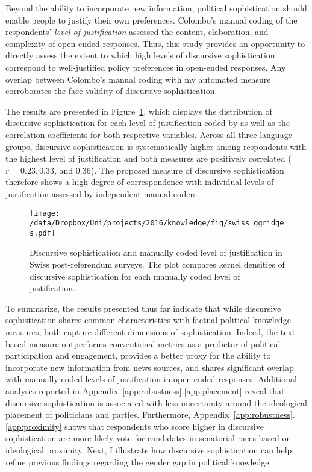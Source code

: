 Beyond the ability to incorporate new information, political sophistication should enable people to justify their own preferences. Colombo's \citeyearpar{colombo2016justifications} manual coding of the respondents' \textit{level of justification} assessed the content, elaboration, and complexity of open-ended responses. Thus, this study provides an opportunity to directly assess the extent to which high levels of discursive sophistication correspond to well-justified policy preferences in open-ended responses. Any overlap between Colombo's \citeyearpar{colombo2016justifications} manual coding with my automated measure corroborates the face validity of discursive sophistication.

The results are presented in Figure~\ref{fig:swiss_ggridges}, which displays the distribution of discursive sophistication for each level of justification coded by \citet{colombo2016justifications} as well as the correlation coefficients for both respective variables. Across all three language groups, discursive sophistication is systematically higher among respondents with the highest level of justification and both measures are positively correlated ($r=0.23, 0.33$, and $0.36$). The proposed measure of discursive sophistication therefore shows a high degree of correspondence with individual levels of justification assessed by independent manual coders.

\begin{figure}[h]\centering
\texttt{[image: /data/Dropbox/Uni/projects/2016/knowledge/fig/swiss\_ggridges.pdf]}
\caption[Discursive sophistication and manually coded level of justification in Swiss post-referendum surveys]{Discursive sophistication and manually coded level of justification \citep{colombo2016justifications} in Swiss post-referendum surveys. The plot compares kernel densities of discursive sophistication for each manually coded level of justification.}\label{fig:swiss_ggridges}
\end{figure}

To summarize, the results presented thus far indicate that while discursive sophistication shares common characteristics with factual political knowledge measures, both capture different dimensions of sophistication. Indeed, the text-based measure outperforms conventional metrics as a predictor of political participation and engagement, provides a better proxy for the ability to incorporate new information from news sources, and shares significant overlap with manually coded levels of justification in open-ended responses. Additional analyses reported in Appendix~\ref{app:robustness}.\ref{app:placement} reveal that discursive sophistication is associated with less uncertainty around the ideological placement of politicians and parties. Furthermore, Appendix~\ref{app:robustness}.\ref{app:proximity} shows that respondents who score higher in discursive sophistication are more likely vote for candidates in senatorial races based on ideological proximity. Next, I illustrate how discursive sophistication can help refine previous findings regarding the gender gap in political knowledge.


